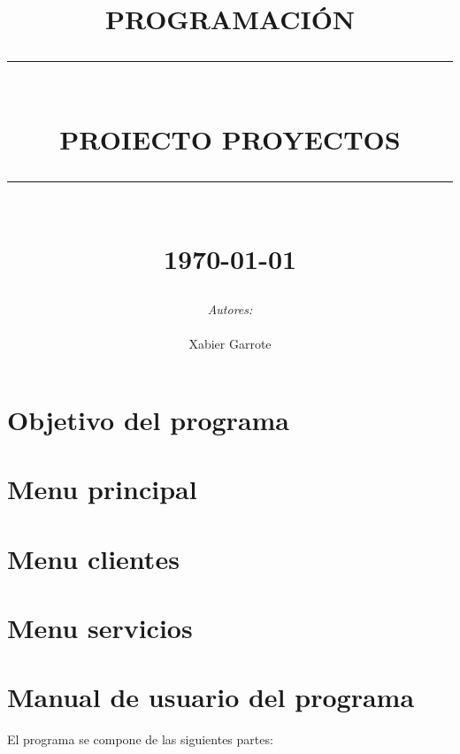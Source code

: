 \documentclass[12pt]{article}
\newcommand{\HRule}[1]{\rule{\linewidth}{#1}}
\begin{document}
\title{ \normalsize \textsc{PROGRAMACIÓN}
		\\ [2.0cm]
		\HRule{2pt} \\
		\LARGE \textbf{\uppercase{Proiecto Proyectos}}
		\HRule{2pt} \\ [0.5cm] \bigskip
		\normalsize \today \vspace*{1\baselineskip}}

\date{}

\author{
        \emph{Autores:} \\ \\
		Xabier Garrote }

\maketitle
\newpage
\tableofcontents
\newpage


\section{Objetivo del programa}

\section{Menu principal}
\section{Menu clientes}
\section{Menu servicios}

\newpage
\section{Manual de usuario del programa}
El programa se compone de las siguientes partes:
\end{document}
